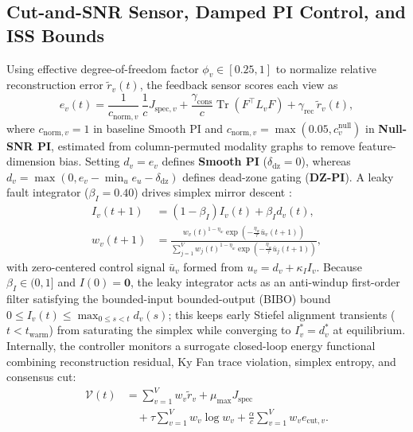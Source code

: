 \documentclass[journal]{IEEEtran}
\begin{document}
\subsection{Cut-and-SNR Sensor, Damped PI Control, and ISS Bounds}
Using effective degree-of-freedom factor $\phi_v \in [0.25, 1]$ to normalize relative reconstruction error $\tilde{r}_v(t)$, the feedback sensor scores each view as
\begin{equation}
e_v(t) = \frac{1}{c_{\mathrm{norm},v}}\,\frac{1}{c} J_{\mathrm{spec},v} + \frac{\gamma_{\mathrm{cons}}}{c}\operatorname{Tr}(F^\top L_v F) + \gamma_{\mathrm{rec}}\,\tilde{r}_v(t),
\label{eq:p2_sensor}
\end{equation}
where $c_{\mathrm{norm},v} = 1$ in baseline Smooth PI and $c_{\mathrm{norm},v} = \max(0.05, c_v^{\mathrm{null}})$ in \textbf{Null-SNR PI}, estimated from column-permuted modality graphs to remove feature-dimension bias. Setting $d_v = e_v$ defines \textbf{Smooth PI} ($\delta_{\mathrm{dz}} = 0$), whereas $d_v = \max(0, e_v - \min_u e_u - \delta_{\mathrm{dz}})$ defines dead-zone gating (\textbf{DZ-PI}). A leaky fault integrator ($\beta_I = 0.40$) drives simplex mirror descent \cite{beck2003mirror}:
\begin{equation}
\begin{aligned}
I_v(t+1) &= (1 - \beta_I) I_v(t) + \beta_I d_v(t), \\
w_v(t+1) &= \frac{w_v(t)^{1-\eta_w}\exp\!\left(-\frac{\eta_w}{\tau}\bar{u}_v(t+1)\right)}{\sum_{j=1}^V w_j(t)^{1-\eta_w}\exp\!\left(-\frac{\eta_w}{\tau}\bar{u}_j(t+1)\right)},
\end{aligned}
\label{eq:p2_w_upd}
\end{equation}
with zero-centered control signal $\bar{u}_v$ formed from $u_v = d_v + \kappa_I I_v$. Because $\beta_I \in (0, 1]$ and $I(0) = \mathbf{0}$, the leaky integrator acts as an anti-windup first-order filter satisfying the bounded-input bounded-output (BIBO) bound $0 \le I_v(t) \le \max_{0 \le s < t} d_v(s)$; this keeps early Stiefel alignment transients ($t < t_{\mathrm{warm}}$) from saturating the simplex while converging to $I_v^* = d_v^*$ at equilibrium. Internally, the controller monitors a surrogate closed-loop energy functional combining reconstruction residual, Ky Fan trace violation, simplex entropy, and consensus cut:
\begin{equation}
\begin{aligned}
\mathcal{V}(t) &= \sum_{v=1}^V w_v \tilde{r}_v + \mu_{\max} J_{\mathrm{spec}} \\
&\quad + \tau \sum_{v=1}^V w_v \log w_v + \frac{\alpha}{c} \sum_{v=1}^V w_v e_{\mathrm{cut},v}.
\end{aligned}
\label{eq:p2_lyap}
\end{equation}
\end{document}
